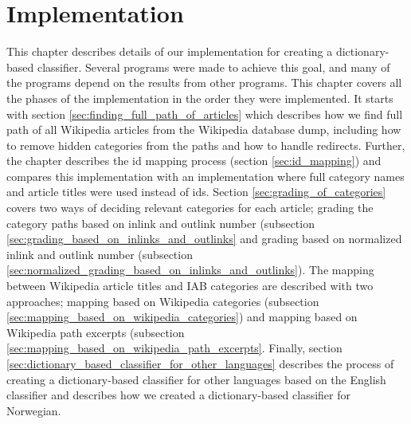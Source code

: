\chapter{Implementation}
This chapter describes details of our implementation for creating a dictionary-based classifier. Several programs were made to achieve this goal, and many of the programs depend on the results from other programs. This chapter covers all the phases of the implementation in the order they were implemented. It starts with section \ref{sec:finding_full_path_of_articles} which describes how we find full path of all Wikipedia articles from the Wikipedia database dump, including how to remove hidden categories from the paths  and how to handle redirects. Further, the chapter describes the id mapping process (section \ref{sec:id_mapping}) and compares this implementation with an implementation where full category names and article titles were used instead of ids. Section \ref{sec:grading_of_categories} covers two ways of deciding relevant categories for each article; grading the  category paths based on inlink and outlink number (subsection \ref{sec:grading_based_on_inlinks_and_outlinks} and grading based on normalized inlink and outlink number (subsection \ref{sec:normalized_grading_based_on_inlinks_and_outlinks}). The mapping between Wikipedia article titles and IAB categories are described with two approaches; mapping based on Wikipedia categories (subsection \ref{sec:mapping_based_on_wikipedia_categories}) and mapping based on Wikipedia path excerpts (subsection \ref{sec:mapping_based_on_wikipedia_path_excerpts}. Finally, section \ref{sec:dictionary_based_classifier_for_other_languages} describes the process of creating a dictionary-based classifier for other languages based on the English classifier and describes how we created a dictionary-based classifier for Norwegian.










